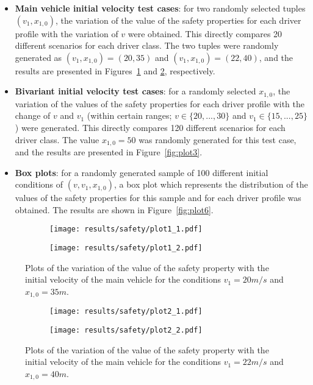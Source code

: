 \begin{itemize}
	\item \textbf{Main vehicle initial velocity test cases}: for two randomly selected tuples $(v_1, x_{1,0})$, the variation of the value of the safety properties for each driver profile with the variation of $v$ were obtained. This directly compares 20 different scenarios for each driver class. The two tuples were randomly generated as $(v_1, x_{1,0}) = (20, 35)$ and $(v_1, x_{1,0}) = (22, 40)$, and the results are presented in Figures~\ref{fig:plot1} and \ref{fig:plot2}, respectively.
	\item \textbf{Bivariant initial velocity test cases}: for a randomly selected $x_{1,0}$, the variation of the values of the safety properties for each driver profile with the change of $v$ and $v_1$ (within certain ranges; $v \in \{20,...,30\}$ and $v_1\in \{15,...,25\}$) were generated. This directly compares 120 different scenarios for each driver class. The value $x_{1,0} = 50$ was randomly generated for this test case, and the results are presented in Figure~\ref{fig:plot3}.
	\item \textbf{Box plots}: for a randomly generated sample of 100 different initial conditions of $(v, v_1, x_{1,0})$, a box plot which represents the distribution of the values of the safety properties for this sample and for each driver profile was obtained. The results are shown in Figure~\ref{fig:plot6}.
\end{itemize}

\begin{figure}[H]
\centering
\begin{subfigure}{0.49\textwidth}
  \centering
  \texttt{[image: results/safety/plot1\_1.pdf]}
\end{subfigure}
\begin{subfigure}{0.49\textwidth}
  \centering
  \texttt{[image: results/safety/plot1\_2.pdf]}
\end{subfigure} 
\caption{Plots of the variation of the value of the safety property with the initial velocity of the main vehicle for the conditions $v_1 = 20m/s$ and $x_{1,0} = 35m$.}
\label{fig:plot1}
\end{figure}

\begin{figure}[H]
\centering
\begin{subfigure}{0.49\textwidth}
  \centering
  \texttt{[image: results/safety/plot2\_1.pdf]}
\end{subfigure}
\begin{subfigure}{0.49\textwidth}
  \centering
  \texttt{[image: results/safety/plot2\_2.pdf]}
\end{subfigure} 
\caption{Plots of the variation of the value of the safety property with the initial velocity of the main vehicle for the conditions $v_1 = 22m/s$ and $x_{1,0} = 40m$.}
\label{fig:plot2}
\end{figure}

